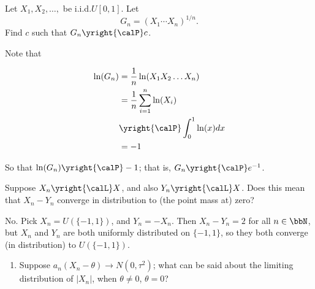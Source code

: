 \begin{problem}[DasGupta 7.21]
  Let \(X_1,X_2,\dotsc,\) be i.i.d.\@ \(U[0,1]\). Let
  \[
    G_n=(X_1\dotsm X_n)^{1/n}.
  \]
  Find \(c\) such that \(G_n\yright{\calP} c\).
\end{problem}
\begin{solution}

Note that

\begin{align*}
  \ln(G_n) &= \frac{1}{n} \ln(X_1 X_2 \ldots X_n) \\
           &= \frac{1}{n} \sum_{i=1}^n \ln(X_i) \\
           &\yright{\calP} \int_0^1 \ln(x) dx \\
           &= -1 \\
\end{align*}

So that $\ln(G_n) \yright{\calP} -1$; that is, $G_n \yright{\calP} e^{-1}$.

\end{solution}
\newpage

\begin{problem}
  Suppose \(X_n\yright{\calL}X\), and also \(Y_n\yright{\calL} X\). Does
  this mean that \(X_n-Y_n\) converge in distribution to (the point mass
  at) zero?
\end{problem}
\begin{solution}
  No. Pick $X_n = U(\{-1,1\})$, and $Y_n = -X_n$. Then $X_n-Y_n = 2$ for
  all $n \in \bbN$, but $X_n$ and $Y_n$ are both uniformly distributed on
  $\{-1,1\}$, so they both converge (in distribution) to $U(\{-1,1\})$.

\end{solution}
\newpage

\begin{problem}[DasGupta 7.31 (a)]
  \begin{enumerate}[label=(\alph*),noitemsep]
  \item Suppose \(a_n(X_n-\theta)\to N(0,\tau^2)\); what can be said
    about the limiting distribution of \(|X_n|\), when \(\theta\neq 0\),
    \(\theta=0\)?
  \end{enumerate}
\end{problem}
\begin{solution}

\end{solution}

